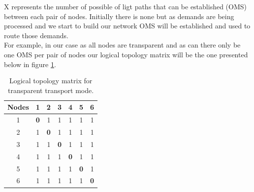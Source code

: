X represents the number of possible of ligt paths that can be established (OMS) between each pair of nodes. Initially there is none but as demands are being processed and we start to build our network OMS will be established and used to route those demands.\\
For example, in our case as all nodes are transparent and as can there only be one OMS per pair of nodes our logical topology matrix will be the one presented below in figure \ref{Transparentlogical_topology}.
\begin{table}[H]
	\centering	
	\begin{tabular}{|c|c|c|c|c|c|c|}
		\hline
		\multicolumn{1}{|l|}{\textbf{Nodes}} & 1   & 2   & 3   & 4   & 5   & 6  \\ \hline
		1                           & \textbf{0}   & 1 & 1 & 1 & 1 & 1 \\ \hline
		2                           & 1 & \textbf{0}   & 1 & 1 & 1 & 1 \\ \hline
		3                           & 1 & 1 & \textbf{0}   & 1 & 1 & 1 \\ \hline
		4                           & 1 & 1 & 1 & \textbf{0}   & 1 & 1 \\ \hline
		5                           & 1 & 1 & 1 & 1 & \textbf{0}   & 1 \\ \hline
		6                           & 1 & 1 & 1 & 1 & 1 & \textbf{0}   \\ \hline
	\end{tabular}
	\caption{Logical topology matrix for transparent transport mode.}
	\label{Transparentlogical_topology}
\end{table}


